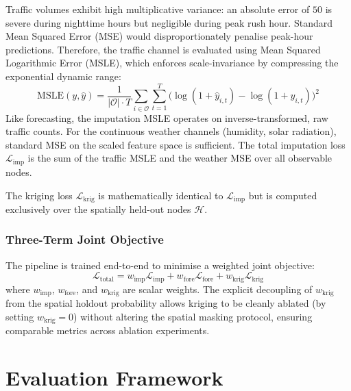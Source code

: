 Traffic volumes exhibit high multiplicative variance: an absolute error of $50$ is severe during nighttime hours but negligible during peak rush hour. Standard Mean Squared Error (MSE) would disproportionately penalise peak-hour predictions. Therefore, the traffic channel is evaluated using Mean Squared Logarithmic Error (MSLE), which enforces scale-invariance by compressing the exponential dynamic range:
\begin{equation}
    \text{MSLE}(y, \hat{y}) = \frac{1}{|\mathcal{O}| \cdot T} \sum_{i \in \mathcal{O}} \sum_{t=1}^T \bigl( \log(1 + \hat{y}_{i,t}) - \log(1 + y_{i,t}) \bigr)^2
\end{equation}
Like forecasting, the imputation MSLE operates on inverse-transformed, raw traffic counts. For the continuous weather channels (humidity, solar radiation), standard MSE on the scaled feature space is sufficient. The total imputation loss $\mathcal{L}_{\text{imp}}$ is the sum of the traffic MSLE and the weather MSE over all observable nodes. 

The kriging loss $\mathcal{L}_{\text{krig}}$ is mathematically identical to $\mathcal{L}_{\text{imp}}$ but is computed exclusively over the spatially held-out nodes $\mathcal{H}$.

\subsubsection{Three-Term Joint Objective}
\label{subsubsec:meth-joint-loss}

The pipeline is trained end-to-end to minimise a weighted joint objective:
\begin{equation}
    \mathcal{L}_{\text{total}} = w_{\text{imp}} \mathcal{L}_{\text{imp}} + w_{\text{fore}} \mathcal{L}_{\text{fore}} + w_{\text{krig}} \mathcal{L}_{\text{krig}}
    \label{eq:joint-loss}
\end{equation}
where $w_{\text{imp}}$, $w_{\text{fore}}$, and $w_{\text{krig}}$ are scalar weights. The explicit decoupling of $w_{\text{krig}}$ from the spatial holdout probability allows kriging to be cleanly ablated (by setting $w_{\text{krig}} = 0$) without altering the spatial masking protocol, ensuring comparable metrics across ablation experiments.

\section{Evaluation Framework}
\label{sec:meth-evaluation}

